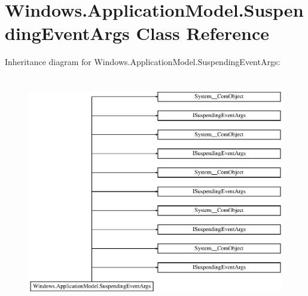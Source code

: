 \hypertarget{class_windows_1_1_application_model_1_1_suspending_event_args}{}\section{Windows.\+Application\+Model.\+Suspending\+Event\+Args Class Reference}
\label{class_windows_1_1_application_model_1_1_suspending_event_args}
Inheritance diagram for Windows.\+Application\+Model.\+Suspending\+Event\+Args\+:\begin{figure}[H]
\begin{center}
\leavevmode
\includegraphics[height=10.232557cm]{class_windows_1_1_application_model_1_1_suspending_event_args}
\end{center}
\end{figure}
